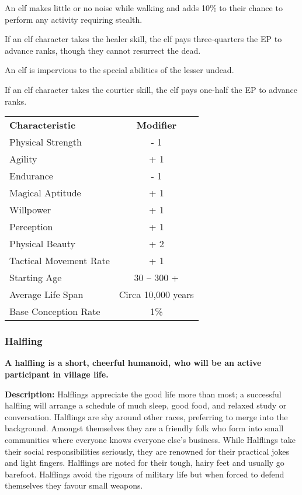 \begin{multicols*}{3}
\begin{Enumerate}
\item
An elf makes little or no noise while walking and adds 10\% to their
chance to perform any activity requiring stealth.

\item
If an elf character takes the healer skill, the elf pays
three-quarters the EP to advance ranks, though they cannot resurrect
the dead.

\item
An elf is impervious to the special abilities of the lesser undead.

\item
If an elf character takes the courtier skill, the elf pays one-half
the EP to advance ranks.
\end{Enumerate}

\begin{tabularx}{\linewidth}{Xc}
\textbf{Characteristic} & \textbf{Modifier} \\
Physical Strength	& - 1 \\
Agility			& + 1 \\
Endurance		& - 1 \\
Magical Aptitude	& + 1 \\
Willpower		& + 1 \\
Perception		& + 1 \\
Physical Beauty		& + 2 \\
Tactical Movement Rate	& + 1 \\
Starting Age		& 30 -- 300 + \\
Average Life Span	& Circa 10,000 years \\
Base Conception Rate	& 1\% \\
\end{tabularx}

\subsubsection{Halfling}

\textbf{A halfling is a short, cheerful humanoid, who will be an
active participant in village life.}

\textbf{Description:} Halflings appreciate the good life more than
most; a successful halfling will arrange a schedule of much sleep,
good food, and relaxed study or conversation. Halflings are shy around
other races, preferring to merge into the background.  Amongst
themselves they are a friendly folk who form into small communities
where everyone knows everyone else's business. While Halflings take
their social responsibilities seriously, they are renowned for their
practical jokes and light fingers. Halflings are noted for their
tough, hairy feet and usually go barefoot. Halflings avoid the rigours
of military life but when forced to defend themselves they favour
small weapons.


\end{multicols*}
